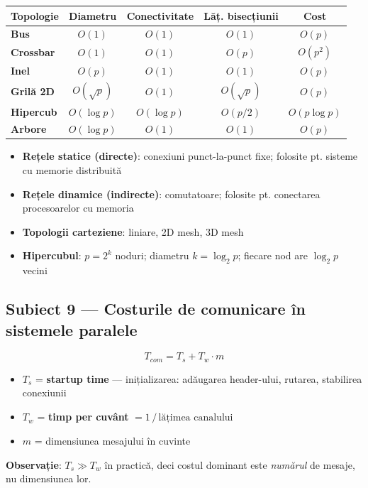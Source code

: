 \documentclass[a4paper,11pt]{article}
\newcommand{\thead}[1]{\cellcolor{tblh}\color{white}\textbf{#1}}
\newcommand{\subiect}[2]{\subsection{Subiect \textcolor{numcol}{#1} — #2}}
\begin{document}
\begin{center}
\begin{tabular}{lcccc}
\toprule
\thead{Topologie} & \thead{Diametru} & \thead{Conectivitate} & \thead{Lăț. bisecțiunii} & \thead{Cost} \\
\midrule
\textbf{Bus} & $O(1)$ & $O(1)$ & $O(1)$ & $O(p)$ \\
\textbf{Crossbar} & $O(1)$ & $O(1)$ & $O(p)$ & $O(p^2)$ \\
\textbf{Inel} & $O(p)$ & $O(1)$ & $O(1)$ & $O(p)$ \\
\textbf{Grilă 2D} & $O(\sqrt{p})$ & $O(1)$ & $O(\sqrt{p})$ & $O(p)$ \\
\textbf{Hipercub} & $O(\log p)$ & $O(\log p)$ & $O(p/2)$ & $O(p \log p)$ \\
\textbf{Arbore} & $O(\log p)$ & $O(1)$ & $O(1)$ & $O(p)$ \\
\bottomrule
\end{tabular}
\end{center}

\begin{itemize}[noitemsep]
  \item \textbf{Rețele statice (directe)}: conexiuni punct-la-punct fixe; folosite pt. sisteme cu memorie distribuită
  \item \textbf{Rețele dinamice (indirecte)}: comutatoare; folosite pt. conectarea procesoarelor cu memoria
  \item \textbf{Topologii carteziene}: liniare, 2D mesh, 3D mesh
  \item \textbf{Hipercubul}: $p = 2^k$ noduri; diametru $k = \log_2 p$; fiecare nod are $\log_2 p$ vecini
\end{itemize}

\subiect{9}{Costurile de comunicare în sistemele paralele}

\begin{formulabox}
\[
T_{com} = T_s + T_w \cdot m
\]
\begin{itemize}[noitemsep]
  \item $T_s$ = \textbf{startup time} — inițializarea: adăugarea header-ului, rutarea, stabilirea conexiunii
  \item $T_w$ = \textbf{timp per cuvânt} $= 1\,/\,\text{lățimea canalului}$
  \item $m$ = dimensiunea mesajului în cuvinte
\end{itemize}
\textbf{Observație}: $T_s \gg T_w$ în practică, deci costul dominant este \emph{numărul} de mesaje, nu dimensiunea lor.
\end{formulabox}
\end{document}
